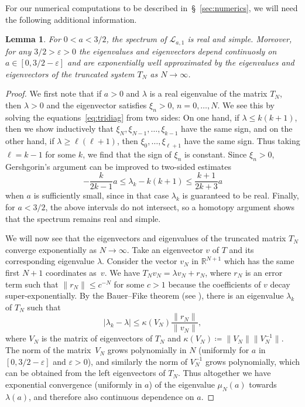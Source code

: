 \documentclass[12pt]{amsart}
\theoremstyle{plain}
\newtheorem{lemma}[theorem]{Lemma}
\numberwithin{equation}{section}
\theoremstyle{definition}
\newcommand{\R}{\mathbb{R}}
\begin{document}
For our numerical computations to be described in~\S~\ref{sec:numerics}, we will need the following additional information.
\begin{lemma} \label{lem:specimproved}
For $0<a<3/2$, the spectrum of $\mathcal{L}_{a,1}$ is real and simple. 
Moreover, for any $3/2>\varepsilon>0$ the eigenvalues and eigenvectors depend continuosly on $a\in[0,3/2-\varepsilon]$ and are exponentially well approximated by the eigenvalues and eigenvectors of the truncated system $T_N$ as $N\to \infty$.
\end{lemma}
\begin{proof}
	We first note that if $a>0$ and $\lambda$ is a real eigenvalue of the matrix $T_N$, then $\lambda>0$ and the eigenvector satisfies $\xi_n>0$, $n=0,\dots,N$. We see this by solving the equations~\eqref{eq:tridiag} from two sides: On one hand, if $\lambda\le k(k+1)$, then we show inductively that $\xi_N, \xi_{N-1},\dots,\xi_{k-1}$ have the same sign, and on the other hand, if $\lambda\ge \ell(\ell+1)$, then $\xi_0,\dots,\xi_{\ell+1}$ have the same sign. Thus taking $\ell=k-1$ for some $k$, we find  that the sign of $\xi_n$ is constant. Since $\xi_n>0$, Gershgorin's argument can be improved to two-sided estimates
		\[-\frac{k}{2k-1}a \le \lambda_k - k(k+1) \le \frac{k+1}{2k+3}a\]
	when $a$ is sufficiently small, since in that case $\lambda_k$ is guaranteed 
to be real. Finally, for $a<3/2$, the above intervals do not intersect, so a 
homotopy argument shows that the spectrum remains real and simple.
	
We will now see that the eigenvectors and eigenvalues of the truncated
matrix $T_N$ converge exponentially as $N\to\infty$. Take an eigenvector $v$ of 
$T$ and its corresponding eigenvalue $\lambda$. Consider 
the vector $v_N$ in $\R^{N+1}$ which has the same first $N+1$ coordinates as~$v$. We 
have $T_N v_N = \lambda v_N+ r_N$, where $r_N$ is an error term such that 
$\|r_N\|\le c^{-N}$ for some $c>1$ because the coefficients of $v$ decay super-exponentially. 
By the Bauer--Fike theorem (see \cite{BF60}), there is an eigenvalue $\lambda_k$ of 
$T_N$ such that 
\[
 |\lambda_k - \lambda| \le \kappa(V_N) \frac{\|r_N\|}{\|v_N\|}, 
\]
where $V_N$ is the matrix of eigenvectors of $T_N$ and $\kappa(V_N) \coloneqq  \|V_N\| 
\|V_N^{-1}\|$. The norm of the matrix~$V_N$ grows polynomially in $N$ 
(uniformly for $a$ in $[0,3/2-\varepsilon]$ and $\varepsilon>0$), and similarly the norm of $V_N^{-1}$ grows polynomially, which can be obtained 
from the left eigenvectors of $T_N$. Thus altogether we have exponential 
convergence (uniformly in $a$) of the eigenvalue $\mu_N(a)$ 
towards $\lambda(a)$, and therefore also continuous dependence on $a$.


\end{proof}
\end{document}
